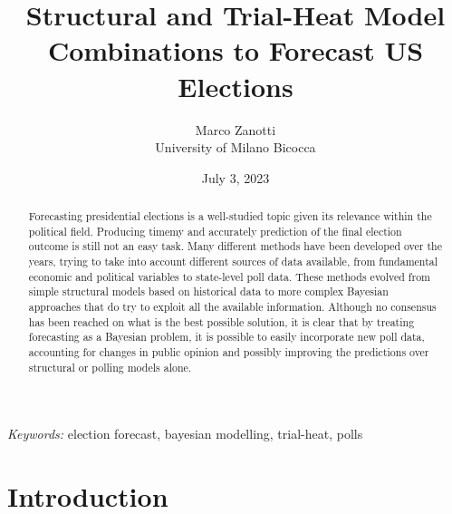 \documentclass[
  12pt]{article}
\begin{document}
\def\spacingset#1{\renewcommand{\baselinestretch}%
{#1}\small\normalsize} \spacingset{1}



\date{July 3, 2023}
\title{\bf Structural and Trial-Heat Model Combinations to Forecast US
Elections}
\author{
Marco Zanotti\\
University of Milano Bicocca\\
}
\maketitle

\bigskip
\bigskip
\begin{abstract}
Forecasting presidential elections is a well-studied topic given its
relevance within the political field. Producing timemy and accurately
prediction of the final election outcome is still not an easy task. Many
different methods have been developed over the years, trying to take
into account different sources of data available, from fundamental
economic and political variables to state-level poll data. These methods
evolved from simple structural models based on historical data to more
complex Bayesian approaches that do try to exploit all the available
information. Although no consensus has been reached on what is the best
possible solution, it is clear that by treating forecasting as a
Bayesian problem, it is possible to easily incorporate new poll data,
accounting for changes in public opinion and possibly improving the
predictions over structural or polling models alone.
\end{abstract}

\noindent%
{\it Keywords:} election forecast, bayesian modelling, trial-heat, polls
\vfill

\newpage
\spacingset{1.9} %
\ifdefined\Shaded\renewenvironment{Shaded}{\begin{tcolorbox}[interior hidden, frame hidden, borderline west={3pt}{0pt}{shadecolor}, enhanced, boxrule=0pt, sharp corners, breakable]}{\end{tcolorbox}}\fi

\hypertarget{sec-intro}{%
\section{Introduction}\label{sec-intro}}
\end{document}
